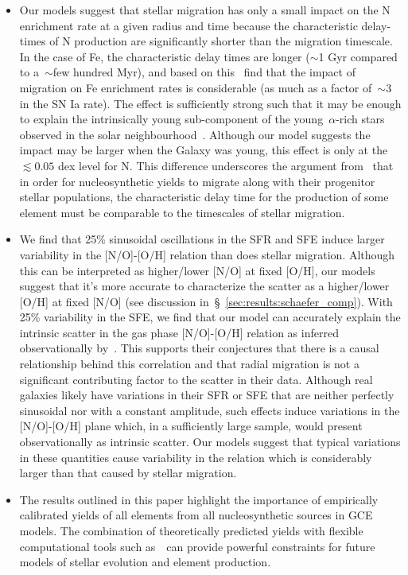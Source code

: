 \documentclass[ms.tex]{subfiles}
\begin{document}
\begin{itemize}
	\item Our models suggest that stellar migration has only a small impact on 
	the N enrichment rate at a given radius and time because the characteristic 
	delay-times of N production are significantly shorter than the migration 
	timescale. 
	In the case of Fe, the characteristic delay times are longer ($\sim$1 Gyr 
	compared to a~$\sim$few hundred Myr), and based on this~\citet{Johnson2021} 
	find that the impact of migration on Fe enrichment rates is considerable 
	(as much as a factor of~$\sim$3 in the SN Ia rate). 
	The effect is sufficiently strong such that it may be enough to explain the 
	intrinsically young sub-component of the young~$\alpha$-rich stars observed 
	in the solar neighbourhood~\citep{Chiappini2015, Martig2015, Martig2016, 
	Jofre2016, Yong2016, Izzard2018, SilvaAguirre2018, Warfield2021}. 
	Although our model suggests the impact may be larger when the Galaxy was 
	young, this effect is only at the~$\lesssim0.05$ dex level for N. 
	This difference underscores the argument from~\citet{Johnson2021} that in 
	order for nucleosynthetic yields to migrate along with their progenitor 
	stellar populations, the characteristic delay time for the production of 
	some element must be comparable to the timescales of stellar migration. 

	\item We find that 25\% sinusoidal oscillations in the SFR and SFE induce 
	larger variability in the [N/O]-[O/H] relation than does stellar migration. 
	Although this can be interpreted as higher/lower [N/O] at fixed [O/H], our 
	models suggest that it's more accurate to characterize the scatter as a 
	higher/lower [O/H] at fixed [N/O] (see discussion 
	in~\S~\ref{sec:results:schaefer_comp}). 
	With 25\% variability in the SFE, we find that our model can accurately 
	explain the intrinsic scatter in the gas phase [N/O]-[O/H] relation as 
	inferred observationally by~\citet{Schaefer2020}. 
	This supports their conjectures that there is a causal relationship behind 
	this correlation and that radial migration is not a significant 
	contributing factor to the scatter in their data. 
	Although real galaxies likely have variations in their SFR or SFE that are 
	neither perfectly sinusoidal nor with a constant amplitude, such effects 
	induce variations in the [N/O]-[O/H] plane which, in a sufficiently large 
	sample, would present observationally as intrinsic scatter.  
	Our models suggest that typical variations in these 
	quantities cause variability in the relation which is considerably larger 
	than that caused by stellar migration. 

	\item The results outlined in this paper highlight the importance of 
	empirically calibrated yields of all elements from all nucleosynthetic 
	sources in GCE models. 
	The combination of theoretically predicted yields with flexible 
	computational tools such as~\vice~can provide powerful constraints for 
	future models of stellar evolution and element production. 
\end{itemize} 
\end{document}
